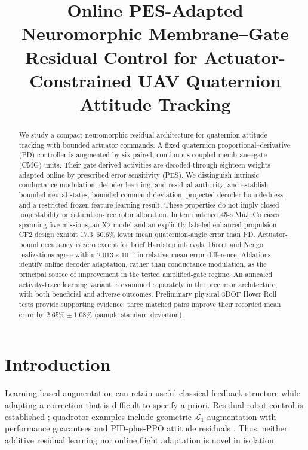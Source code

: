 \documentclass[letterpaper,10pt,conference]{IEEEtran}
\title{Online PES-Adapted Neuromorphic Membrane--Gate Residual Control for
Actuator-Constrained UAV Quaternion Attitude Tracking}
\author{}
\begin{document}
\maketitle
\thispagestyle{empty}
\pagestyle{empty}

\begin{abstract}
We study a compact neuromorphic residual architecture for quaternion
attitude tracking with bounded actuator commands. A fixed quaternion
proportional--derivative (PD) controller is augmented by six paired,
continuous coupled membrane--gate (CMG) units. Their gate-derived activities
are decoded through eighteen weights adapted online by prescribed error
sensitivity (PES). We distinguish intrinsic conductance modulation,
decoder learning, and residual authority, and establish bounded neural
states, bounded command deviation, projected decoder boundedness, and a
restricted frozen-feature learning result. These properties do not imply
closed-loop stability or saturation-free rotor allocation. In ten matched
45-s MuJoCo cases spanning five missions, an X2 model and an explicitly
labeled enhanced-propulsion CF2 design exhibit 17.3--60.6\% lower mean
quaternion-angle error than PD. Actuator-bound occupancy is zero except
for brief Hardstep intervals. Direct and Nengo realizations agree within
$2.013\times10^{-6}$ in relative mean-error difference. Ablations identify
online decoder adaptation, rather than conductance modulation, as the
principal source of improvement in the tested amplified-gate regime.
An annealed activity-trace learning variant is examined separately in the
precursor architecture, with both beneficial and adverse outcomes.
Preliminary physical 3DOF Hover Roll tests provide supporting evidence:
three matched pairs improve their recorded mean error by
$2.65\%\pm1.08\%$ (sample standard deviation).
\end{abstract}

\section{Introduction}
Learning-based augmentation can retain useful classical feedback structure
while adapting a correction that is difficult to specify a priori.
Residual robot control is established \cite{johannink2019}; quadrotor
examples include geometric $\mathcal L_1$ augmentation with performance
guarantees \cite{wu2025l1quad} and PID-plus-PPO attitude residuals
\cite{li2027hpappo}. Thus, neither additive residual learning nor online
flight adaptation is novel in isolation.
\end{document}
